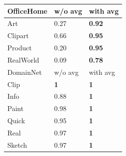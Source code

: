 \begin{table}[t]
\begin{minipage}{.5\linewidth}
\begin{tabular}{lll}
        OfficeHome    & w/o avg & with avg   \\ \hline
        Art     & 0.27   & \textbf{0.92}   \\
        Clipart & 0.66   & \textbf{0.95} \\
        Product   & 0.20   & \textbf{0.95} \\
        RealWorld  & 0.09   & \textbf{0.78}  \\ \hhline{===}
        DomainNet    & w/o avg & with avg   \\ \hline
        Clip     & \textbf{1}   & \textbf{1}   \\
        Info & 0.88   & \textbf{1 }  \\
        Paint   & 0.98   & \textbf{1 } \\
        Quick  & 0.95   & \textbf{1 }  \\ 
        Real   & 0.97   & \textbf{1 } \\
        Sketch  & 0.97   & \textbf{1 }  \\ 
        \hline
        \end{tabular}
        \label{tab:rank_correlation_ensemble}
    \end{minipage} 
\end{table}

